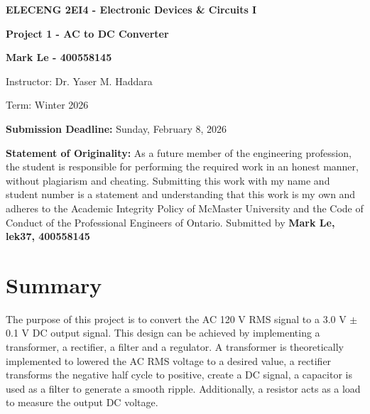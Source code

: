 \documentclass[12pt]{article}
\begin{document}
    
    \begin{titlepage}
    \begin{center}
    \vspace*{\fill}

    {\LARGE \textbf{ELECENG 2EI4 - Electronic Devices \& Circuits I}\par}
    \vspace{2.5cm}

    {\LARGE\bfseries Project 1 - AC to DC Converter\par}
    \vspace{2.5cm}
    
    {\Large \textbf{Mark Le - 400558145}\par}
    \vspace{2.5cm}
    
    {\large Instructor: Dr. Yaser M. Haddara\par}
    \vspace{0.5cm}
    {\large Term: Winter 2026 \par}
    \vspace{0.5cm}
    
    {\large \textbf{Submission Deadline:} Sunday, February 8, 2026\par}
    \end{center}

    \vspace*{\fill}

    \textbf{Statement of Originality:} As a future member of the engineering profession, the student is responsible for performing the required work in an honest manner, without plagiarism and cheating. Submitting this work with my name and student number is a statement and understanding that this work is my own and adheres to the Academic Integrity Policy of McMaster University and the Code of Conduct of the Professional Engineers of Ontario. Submitted by \textbf{Mark Le, lek37, 400558145}

\end{titlepage}

    \newpage
    \tableofcontents

    \listoffigures

    \listoftables

    \newpage
    \section{Summary}

    The purpose of this project is to convert the AC 120 V RMS signal to a 3.0 V \(\pm\) 0.1 V DC output signal. This design can be achieved by implementing a transformer, a rectifier, a filter and a regulator. A transformer is theoretically implemented to lowered the AC RMS voltage to a desired value, a rectifier transforms the negative half cycle to positive, create a DC signal, a capacitor is used as a filter to generate a smooth ripple. Additionally, a resistor acts as a load to measure the output DC voltage.  
    
\end{document}
